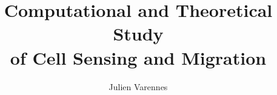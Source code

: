 \documentclass[ece,dissertation]{puthesis}
\title{Computational and Theoretical Study \\ of Cell Sensing and Migration}
\author{Julien Varennes}{Varennes, Julien}
\begin{document}
\volume



% 







% 



% 
% 
% 
% 
% 
% 

% 
\end{document}
